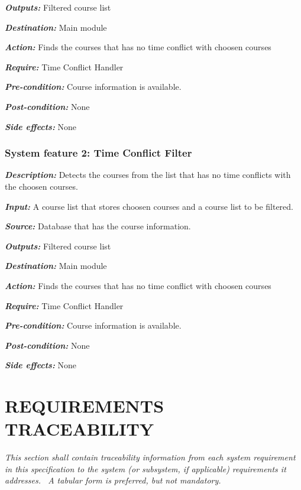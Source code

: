 \documentclass[twoside,letterpaper]{article}
\begin{document}
\emph{\textbf{Outputs:}} Filtered course list

\emph{\textbf{Destination:}} Main module

\emph{\textbf{Action:}} Finds the courses that has no time conflict with choosen courses 

\emph{\textbf{Require:}} Time Conflict Handler

\emph{\textbf{Pre-condition: }} Course information is available.

\emph{\textbf{Post-condition: }} None

\emph{\textbf{Side effects:}} None

\subsubsection[System feature 3: Time Conflict Filter]{\rmfamily\bfseries\color{black} System feature 2: Time Conflict Filter}
\emph{\textbf{Description:}} Detects the courses from the list that has no time conflicts with the choosen courses. 

\emph{\textbf{Input:}}  A course list that stores choosen courses and a course list to be filtered.

\emph{\textbf{Source:}} Database that has the course information.

\emph{\textbf{Outputs:}} Filtered course list

\emph{\textbf{Destination:}} Main module

\emph{\textbf{Action:}} Finds the courses that has no time conflict with choosen courses 

\emph{\textbf{Require:}} Time Conflict Handler

\emph{\textbf{Pre-condition: }} Course information is available.

\emph{\textbf{Post-condition: }} None

\emph{\textbf{Side effects:}} None

\clearpage\pagestyle{Standard}
\section[REQUIREMENTS
TRACEABILITY]{\rmfamily\bfseries\color{black}
REQUIREMENTS TRACEABILITY}
{\itshape\color{black}
This section shall contain traceability information from each system
requirement in this specification to the system (or subsystem, if
applicable) requirements it addresses. \ A tabular form is preferred,
but not mandatory.}
\end{document}
